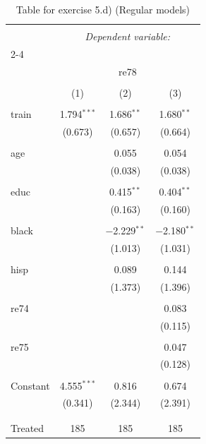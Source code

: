 
\begin{table}[!htbp] \centering 
  \caption{Table for exercise 5.d) (Regular models)} 
  \label{} 
\begin{tabular}{@{\extracolsep{5pt}}lccc} 
\\[-1.8ex]\hline 
\hline \\[-1.8ex] 
 & \multicolumn{3}{c}{\textit{Dependent variable:}} \\ 
\cline{2-4} 
\\[-1.8ex] & \multicolumn{3}{c}{re78} \\ 
\\[-1.8ex] & (1) & (2) & (3)\\ 
\hline \\[-1.8ex] 
 train & 1.794$^{***}$ & 1.686$^{**}$ & 1.680$^{**}$ \\ 
  & (0.673) & (0.657) & (0.664) \\ 
  & & & \\ 
 age &  & 0.055 & 0.054 \\ 
  &  & (0.038) & (0.038) \\ 
  & & & \\ 
 educ &  & 0.415$^{**}$ & 0.404$^{**}$ \\ 
  &  & (0.163) & (0.160) \\ 
  & & & \\ 
 black &  & $-$2.229$^{**}$ & $-$2.180$^{**}$ \\ 
  &  & (1.013) & (1.031) \\ 
  & & & \\ 
 hisp &  & 0.089 & 0.144 \\ 
  &  & (1.373) & (1.396) \\ 
  & & & \\ 
 re74 &  &  & 0.083 \\ 
  &  &  & (0.115) \\ 
  & & & \\ 
 re75 &  &  & 0.047 \\ 
  &  &  & (0.128) \\ 
  & & & \\ 
 Constant & 4.555$^{***}$ & 0.816 & 0.674 \\ 
  & (0.341) & (2.344) & (2.391) \\ 
  & & & \\ 
\hline \\[-1.8ex] 
Treated & 185 & 185 & 185 \\ 

\end{tabular}
\end{table}
